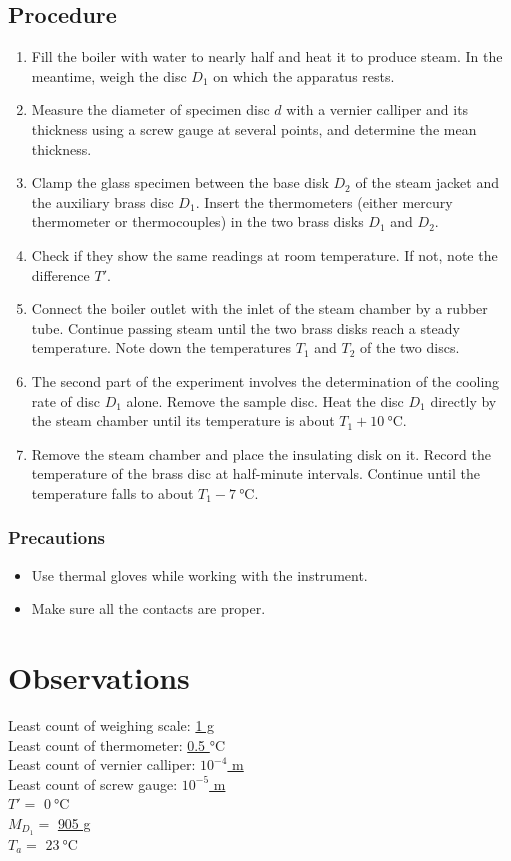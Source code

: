 \documentclass[%
 reprint,
 sor,
 jor,
 amsmath,amssymb,
 aps,
]{revtex4-2}
\begin{document}
\subsection{Procedure}
\begin{enumerate}
    \item Fill the boiler with water to nearly half and heat it to produce steam. In the meantime, weigh the disc ${D_1}$ on which the apparatus rests.
    \item Measure the diameter of specimen disc $d$ with a vernier calliper and its thickness using a screw gauge at several points, and determine the mean thickness.
    \item Clamp the glass specimen between the base disk ${D_2}$ of the steam jacket and the auxiliary brass disc ${D_1}$. Insert the thermometers (either mercury thermometer or thermocouples) in the two brass disks ${D_1}$ and ${D_2}$.
    \item Check if they show the same readings at room temperature. If not, note the difference $T'$.
    \item Connect the boiler outlet with the inlet of the steam chamber by a rubber tube. Continue passing steam until the two brass disks reach a steady temperature. Note down the temperatures $T_1$ and $T_2$ of the two discs.
    \item The second part of the experiment involves the determination of the cooling rate of disc ${D_1}$ alone. Remove the sample disc. Heat the disc ${D_1}$ directly by the steam chamber until its temperature is about $T_1 + \SI{10}{\celsius}$.
    \item Remove the steam chamber and place the insulating disk on it. Record the temperature of the brass disc at half-minute intervals. Continue until the temperature falls to about $T_1 - \SI{7}{\celsius}$.
\end{enumerate}



\subsubsection{Precautions}
\begin{itemize}
	\item Use thermal gloves while working with the instrument.
	\item Make sure all the contacts are proper.
\end{itemize}



\section{Observations}
\noindent Least count of weighing scale:   \uline{1 g}  \\
Least count of thermometer:  \uline{ 0.5 $\si{\celsius}$ }\\
Least count of vernier calliper:  \uline{$10^{-4}$ m } \\
Least count of screw gauge:  \uline{$10^{-5}$ m } \\
\noindent $T'=$  \uline{$0~\si{\celsius}$}\\
\noindent$M_{D_1} = $ \uline{905 g}\\
\noindent $T_a =$ \uline{$23~\si{\celsius}$}
\end{document}
